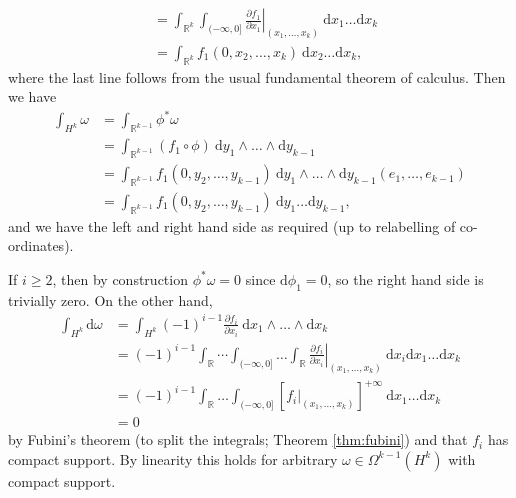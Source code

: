 \documentclass[letter-paper]{tufte-book}
\newenvironment{proof}[1][Proof]{\begin{trivlist}
\item[\hskip \labelsep {\bfseries #1}]}{\end{trivlist}}
\begin{document}
\begin{proof}
\begin{enumerate}
\begin{align*}
        &= \int_{\mathbb{R}^k}\int_{(-\infty, 0]} \left.\frac{\partial f_1}{\partial x_1}\right|_{(x_1, \ldots, x_k)}\ \mathrm{d}x_1 \ldots \mathrm{d}x_k\\
        &= \int_{\mathbb{R}^k}f_1(0, x_2, \ldots, x_k)\ \mathrm{d}x_2 \ldots \mathrm{d}x_k,
    \end{align*}
    where the last line follows from the usual fundamental theorem of calculus. Then we have
    \begin{align*}
      \int_{H^k}\omega 
        &= \int_{\mathbb{R}^{k-1}} \phi^*\omega\\
        &= \int_{\mathbb{R}^{k-1}}(f_1 \circ \phi)\ \mathrm{d}y_1 \wedge \ldots \wedge \mathrm{d}y_{k-1}\\
        &= \int_{\mathbb{R}^{k-1}} f_1(0, y_2, \ldots, y_{k-1})\ \mathrm{d}y_1 \wedge \ldots \wedge \mathrm{d}y_{k-1}(e_1, \ldots, e_{k-1})\\
        &= \int_{\mathbb{R}^{k-1}} f_1(0, y_2, \ldots, y_{k-1})\ \mathrm{d}y_1 \ldots \mathrm{d}y_{k-1},
    \end{align*}
    and we have the left and right hand side as required (up to relabelling of co-ordinates).
    
    If $i\geq 2$, then by construction $\phi^*\omega = 0$ since $\mathrm{d}\phi_1 = 0$, so the right hand side is trivially zero. On the other hand,
    \begin{align*}
      \int_{H^k}\mathrm{d}\omega
        &= \int_{H^k} (-1)^{i-1} \frac{\partial f_i}{\partial x_i}\ \mathrm{d}x_1 \wedge \ldots \wedge \mathrm{d}x_k\\
        &= (-1)^{i-1} \int_\mathbb{R} \cdots \int_{(-\infty, 0]} \ldots \int_\mathbb{R} \left.\frac{\partial f_i}{\partial x_i}\right|_{(x_1, \ldots, x_k)}\ \mathrm{d}x_i \mathrm{d}x_1 \ldots \mathrm{d}x_k\\
        &= (-1)^{i-1} \int_\mathbb{R} \ldots \int_{(-\infty, 0]} \left[\left.f_i\right|_{(x_1, \ldots, x_k)}\right]^{+\infty}\ \mathrm{d}x_1 \ldots \mathrm{d}x_k\\
        &=0
    \end{align*}
    by Fubini's theorem (to split the integrals; Theorem \ref{thm:fubini}) and that $f_i$ has compact support. By linearity this holds for arbitrary $\omega \in \Omega^{k-1}(H^k)$ with compact support.
    

\end{enumerate}
\end{proof}
\end{document}
